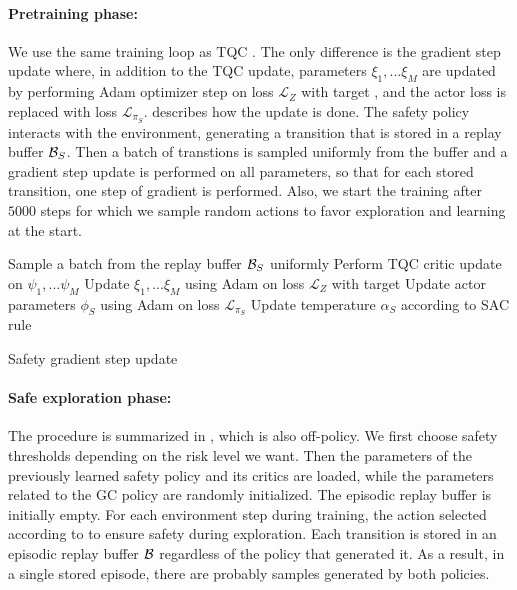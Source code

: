 \paragraph{\textbf{Pretraining phase:}} We use the same training loop as TQC 
\cite{TQC}. The only difference is the gradient step update where, in addition to the TQC update,
parameters $\xi_1, ... \xi_M$ are updated by performing Adam optimizer step on 
loss $\mathcal{L}_{Z}$ with target , and the actor loss is replaced with loss $\mathcal{L}_{\pi_S}$.
 describes how the update is done.
The safety policy interacts with the environment, generating a
transition that is stored in a replay buffer $\mathcal{B}_S$. Then a batch of transtions is sampled uniformly
from the buffer and a gradient step update is performed on all parameters, so that for each stored transition,
one step of gradient is performed. 
Also, we start the training after $5000$ steps for which we sample random actions
to favor exploration and learning at the start.

\begin{algorithm}[H]
\begin{algorithmic}[1]
\STATE Sample a batch from the replay buffer $\mathcal{B}_S$ uniformly
\STATE Perform TQC critic update on $\psi_1, ... \psi_M$ \cite{TQC}
\STATE Update $\xi_1, ... \xi_M$ using Adam on loss $\mathcal{L}_{Z}$ with target 
\STATE Update actor parameters $\phi_S$ using Adam on loss $\mathcal{L}_{\pi_S}$
\STATE Update temperature $\alpha_S$ according to SAC rule \cite{SAC}
\end{algorithmic}
\caption{Safety gradient step update}
\label{alg:safety_update}
\end{algorithm}

\paragraph{\textbf{Safe exploration phase:}} The procedure is summarized in , 
which is also off-policy. 
We first choose safety thresholds depending on the risk level we want. 
Then the parameters of the previously learned safety policy and its critics are loaded,
while the parameters related to the GC policy are randomly initialized. The episodic replay buffer is 
initially empty. For each environment step during training, the action selected according to 
 to ensure safety during exploration. Each transition is stored in an 
episodic replay buffer $\mathcal{B}$ regardless of the policy that generated it. As a result, in a single stored episode,
there are probably samples generated by both policies. 

